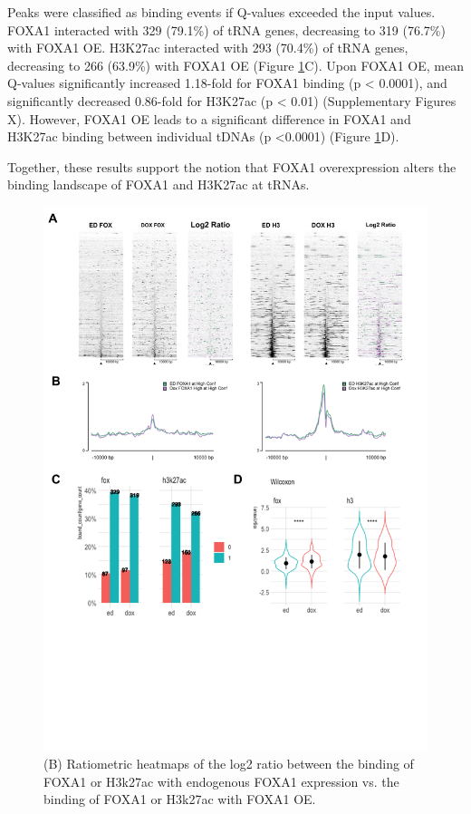 \documentclass[
  12pt,
]{article}
\begin{document}
Peaks were classified as binding events if Q-values exceeded the input values.
FOXA1 interacted with 329 (79.1\%) of tRNA genes, decreasing to 319 (76.7\%) with FOXA1 OE. H3K27ac interacted with 293 (70.4\%) of tRNA genes, decreasing to 266 (63.9\%) with FOXA1 OE (Figure \ref{fig:results-1}C).
Upon FOXA1 OE, mean Q-values significantly increased 1.18-fold for FOXA1 binding (p \textless{} 0.0001), and significantly decreased 0.86-fold for H3K27ac (p \textless{} 0.01) (Supplementary Figures X).
However, FOXA1 OE leads to a significant difference in FOXA1 and H3K27ac binding between individual tDNAs (p \textless0.0001) (Figure \ref{fig:results-1}D).

Together, these results support the notion that FOXA1 overexpression alters the binding landscape of FOXA1 and H3K27ac at tRNAs.

\begin{figure}[H]

{\centering \includegraphics[width=1\linewidth]{../images/results-01} 

}

\caption{(B) Ratiometric heatmaps of the log2 ratio between the binding of FOXA1 or H3k27ac with endogenous FOXA1 expression vs. the binding of FOXA1 or H3k27ac with FOXA1 OE.}\label{fig:results-1}
\end{figure}
\end{document}
